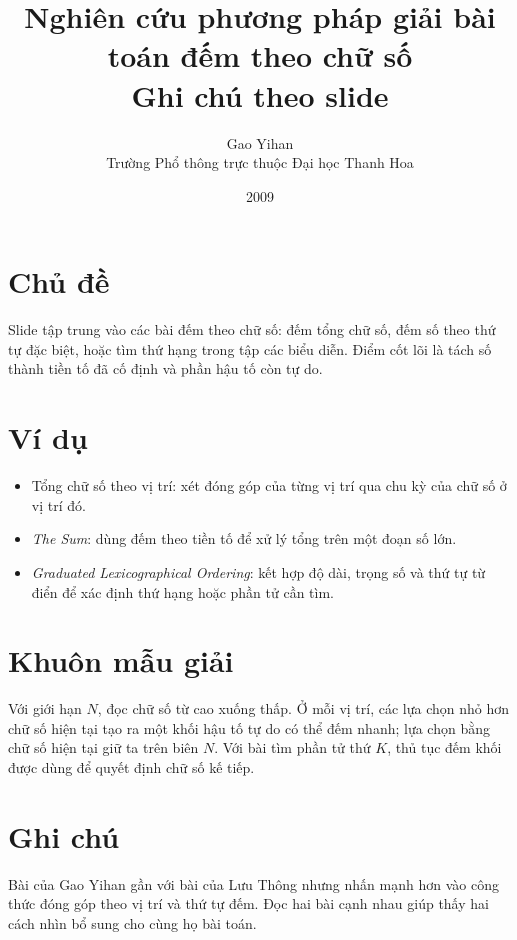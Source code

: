 \documentclass[11pt]{article}
\title{Nghiên cứu phương pháp giải bài toán đếm theo chữ số\\{\large Ghi chú theo slide}}
\author{Gao Yihan\\Trường Phổ thông trực thuộc Đại học Thanh Hoa}
\date{2009}
\begin{document}
\maketitle


\section{Chủ đề}

Slide tập trung vào các bài đếm theo chữ số: đếm tổng chữ số, đếm số theo
thứ tự đặc biệt, hoặc tìm thứ hạng trong tập các biểu diễn. Điểm cốt lõi là
tách số thành tiền tố đã cố định và phần hậu tố còn tự do.

\section{Ví dụ}

\begin{itemize}
  \item Tổng chữ số theo vị trí: xét đóng góp của từng vị trí qua chu kỳ của
  chữ số ở vị trí đó.
  \item \textit{The Sum}: dùng đếm theo tiền tố để xử lý tổng trên một đoạn
  số lớn.
  \item \textit{Graduated Lexicographical Ordering}: kết hợp độ dài, trọng số
  và thứ tự từ điển để xác định thứ hạng hoặc phần tử cần tìm.
\end{itemize}

\section{Khuôn mẫu giải}

Với giới hạn \(N\), đọc chữ số từ cao xuống thấp. Ở mỗi vị trí, các lựa chọn
nhỏ hơn chữ số hiện tại tạo ra một khối hậu tố tự do có thể đếm nhanh; lựa
chọn bằng chữ số hiện tại giữ ta trên biên \(N\). Với bài tìm phần tử thứ
\(K\), thủ tục đếm khối được dùng để quyết định chữ số kế tiếp.

\section{Ghi chú}

Bài của Gao Yihan gần với bài của Lưu Thông nhưng nhấn mạnh hơn vào công thức
đóng góp theo vị trí và thứ tự đếm. Đọc hai bài cạnh nhau giúp thấy hai cách
nhìn bổ sung cho cùng họ bài toán.
\end{document}
